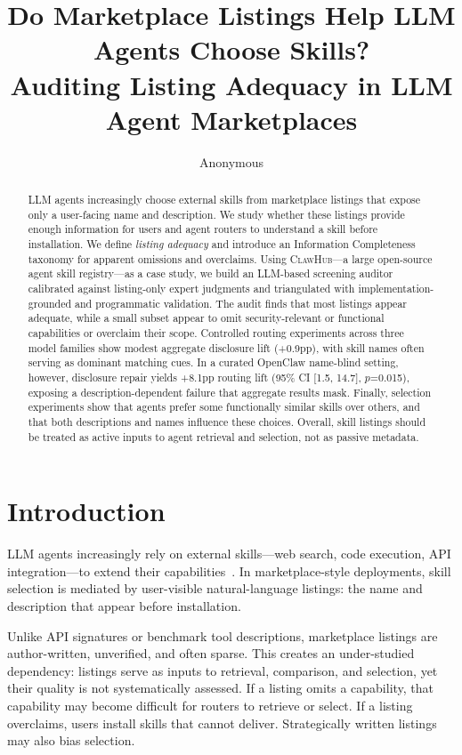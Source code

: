 \documentclass[11pt]{article}
\title{Do Marketplace Listings Help LLM Agents Choose Skills?\\
Auditing Listing Adequacy in LLM Agent Marketplaces}
\author{Anonymous}
\newcommand{\clawhub}{\textsc{ClawHub}\xspace}
\begin{document}
\maketitle

\begin{abstract}
LLM agents increasingly choose external skills from
marketplace listings that expose only a user-facing
name and description.
We study whether these listings provide enough
information for users and agent routers to understand
a skill before installation.
We define \emph{listing adequacy} and introduce an
Information Completeness taxonomy for apparent
omissions and overclaims.
Using \clawhub---a large open-source agent skill
registry---as a case study, we build an LLM-based
screening auditor calibrated against listing-only expert
judgments and triangulated with implementation-grounded
and programmatic validation.
The audit finds that most listings appear adequate,
while a small subset appear to omit security-relevant or
functional capabilities or overclaim their scope.
Controlled routing experiments across three model families
show modest aggregate disclosure lift (+0.9pp), with
skill names often serving as dominant matching cues.
In a curated OpenClaw name-blind setting, however,
disclosure repair yields +8.1pp routing lift
(95\% CI [1.5, 14.7], $p$=0.015), exposing a
description-dependent failure that aggregate results mask.
Finally, selection experiments show that agents prefer
some functionally similar skills over others, and that
both descriptions and names influence these choices.
Overall, skill listings should be treated as active
inputs to agent retrieval and selection, not as passive
metadata.
\end{abstract}

\section{Introduction}
\label{sec:intro}

LLM agents increasingly rely on external skills---web
search, code execution, API integration---to extend
their capabilities~\cite{schick2023toolformer,
qin2023toolllm, patil2023gorilla}.
In marketplace-style deployments, skill selection is
mediated by user-visible natural-language listings:
the name and description that appear before installation.

Unlike API signatures or benchmark tool descriptions,
marketplace listings are author-written, unverified,
and often sparse.
This creates an under-studied dependency: listings
serve as inputs to retrieval, comparison, and
selection, yet their quality is not systematically
assessed.
If a listing omits a capability, that capability may
become difficult for routers to retrieve or select.
If a listing overclaims, users install skills that
cannot deliver.
Strategically written listings may also bias selection.
\end{document}
